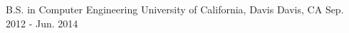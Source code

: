 

\begin{cventries}


  \cventry
    {B.S. in Computer Engineering} %
    {University of California, Davis} %
    {Davis, CA} %
    {Sep. 2012 - Jun. 2014} %
    {} %
    {}

\end{cventries}
